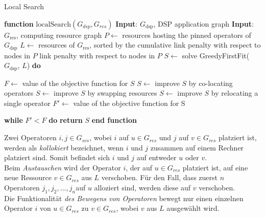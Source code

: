 \documentclass{article}
\begin{document}
\begin{algorithm}[H]
    \caption{Local Search}
    \begin{algorithmic}[1]
        \STATE \textbf{function} $\mathrm{localSearch}(G_{dsp}, G_{res})$
        \STATE \textbf{Input}: $G_{\text{dsp}}$, DSP application graph
        \STATE \textbf{Input}: $G_{\text{res}}$, computing resource graph
        \STATE $P \leftarrow$ resources hosting the pinned operators of $G_{\text{dsp}}$
        \STATE $L \leftarrow$ resources of $G_{\text{res}}$, 
        sorted by the cumulative link penalty with respect to nodes in $P$
        \STATE link penalty with respect to nodes in $P$
        \STATE $S \leftarrow$  solve GreedyFirstFit($G_{\text{dsp}}$, $L$)
        \STATE \textbf{do}

        \STATE \hspace{\algorithmicindent} $F \leftarrow$  value of the objective function for $S$
        \STATE \hspace{\algorithmicindent} $S \leftarrow$  improve $S$ by co-locating operators
        \STATE \hspace{\algorithmicindent} $S \leftarrow$  improve $S$ by swapping resources
        \STATE \hspace{\algorithmicindent} $S \leftarrow$  improve $S$ by relocating a single operator
        \STATE \hspace{\algorithmicindent} $F' \leftarrow$ value of the objective function for S

        \STATE \textbf{while} $F'  < F$ \textbf{do}
        \STATE \hspace{\algorithmicindent} \textbf{return} $S$
        \STATE \textbf{end function}
    \end{algorithmic}
    \label{local-search-algo}
\end{algorithm}


Zwei Operatoren $i,j \in G_{svs}$, wobei $i$ auf $u \in G_{res}$ und $j$ auf $v \in G_{res}$ platziert ist, werden als \textit{kollokiert} bezeichnet, 
wenn $i$ und $j$ zusammen auf einem Rechner platziert sind. Somit befindet sich $i$ und $j$ auf entweder $u$ oder $v$.\\
Beim \textit{Austauschen} wird der Operator $i$, der auf $u \in G_{res}$ platziert ist, auf eine neue Ressource $v \in G_{res}$ aus $L$ verschoben. 
Für den Fall, dass zuerst $n$ Operatoren $j_1, j_2, ..., j_n$auf $u$ alloziert sind, werden diese auf $v$ verschoben. \\ 
Die Funktionalität \textit{des Bewegens von Operatoren}  bewegt nur einen einzelnen Operator $i$ von $u \in G_{res}$ zu $v \in G_{res}$, 
wobei $v$ aus $L$ ausgewählt wird. 
\end{document}
